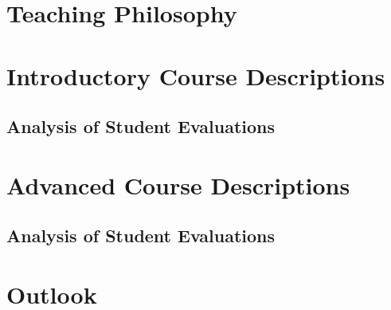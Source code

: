 \documentclass[../main.tex]{subfiles}
\begin{document}
\section{Teaching Philosophy}

\begin{flushleft}

\end{flushleft}

\section{Introductory Course Descriptions}

\begin{flushleft}

\end{flushleft}

\subsection{Analysis of Student Evaluations}

\begin{flushleft}

\end{flushleft}

\section{Advanced Course Descriptions}

\begin{flushleft}

\end{flushleft}

\subsection{Analysis of Student Evaluations}

\begin{flushleft}

\end{flushleft}

\section{Outlook}

\begin{flushleft}

\end{flushleft}

%
%
\end{document}

